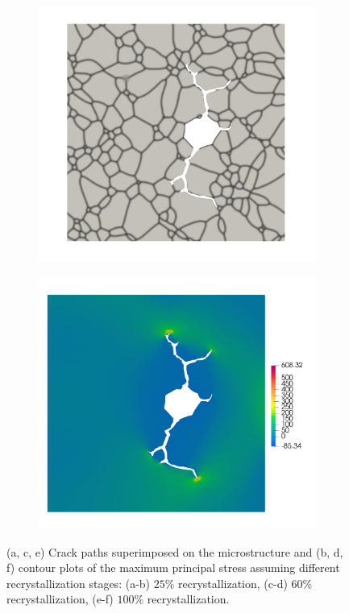 \begin{figure}[htb!]
\begin{subfigure}[t]{0.4\linewidth}
    \caption{}
  \end{subfigure}\\
  \begin{subfigure}[t]{0.4\linewidth}
    \centering
    \includegraphics[width=\linewidth]{Chapter3/figures/partial_hbs_3}
    \caption{}
  \end{subfigure}
  \begin{subfigure}[t]{0.4\linewidth}
    \centering
    \includegraphics[width=\linewidth]{Chapter3/figures/partial_hbs_3_stress}
    \caption{}
  \end{subfigure}
  \caption{ (a, c, e) Crack paths superimposed on the microstructure and (b, d, f) contour plots of the maximum principal stress assuming different recrystallization stages: (a-b) $25\%$ recrystallization, (c-d) $60\%$ recrystallization, (e-f) $100\%$ recrystallization. }
  \label{fig:partial_hbs}
\end{figure}
